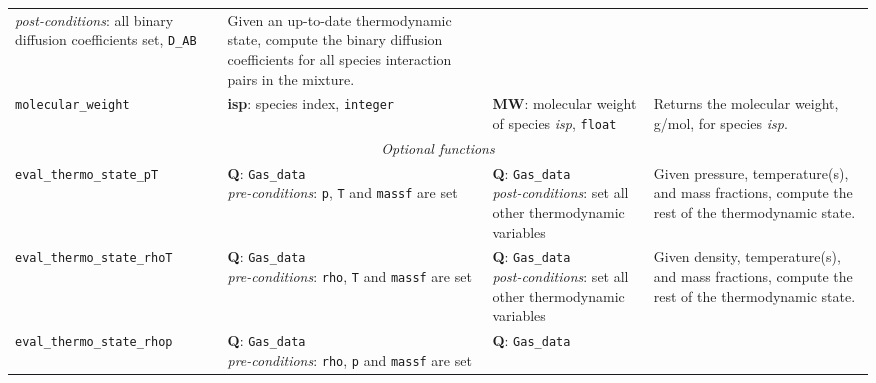 \begin{landscape}
\begin{center}
\begin{longtable}{p{5.5cm}p{4.5cm}p{4.5cm}p{6.5cm}}
{                                                      \textit{post-conditions}: all binary diffusion coefficients set, \texttt{D\_AB}}
                                       & Given an up-to-date thermodynamic state, compute the binary diffusion coefficients for
                                         all species interaction pairs in the mixture. \\
\texttt{molecular\_weight}             & \raggedright{\textbf{isp}: species index, \texttt{integer}} 
                                       & \raggedright{\textbf{MW}: molecular weight of species \textit{isp}, \texttt{float}}
                                       & Returns the molecular weight, g/mol, for species \textit{isp}. \\ \hline
\multicolumn{4}{c}{\emph{Optional functions}} \\
\texttt{eval\_thermo\_state\_pT} & \raggedright{\textbf{Q}: \texttt{Gas\_data} \\
                                                \textit{pre-conditions}: \texttt{p}, \texttt{T} and \texttt{massf} are set}
                                 & \raggedright{\textbf{Q}: \texttt{Gas\_data} \\
                                                  \textit{post-conditions}: set all other thermodynamic variables} 
                                   &   Given pressure, temperature(s), and mass fractions,
                                       compute the rest of the thermodynamic state. \\
\texttt{eval\_thermo\_state\_rhoT} & \raggedright{\textbf{Q}: \texttt{Gas\_data} \\
                                                \textit{pre-conditions}: \texttt{rho}, \texttt{T} and \texttt{massf} are set}
                                 & \raggedright{\textbf{Q}: \texttt{Gas\_data} \\
                                                  \textit{post-conditions}: set all other thermodynamic variables} 
                                   &   Given density, temperature(s), and mass fractions,
                                       compute the rest of the thermodynamic state. \\
\texttt{eval\_thermo\_state\_rhop} & \raggedright{\textbf{Q}: \texttt{Gas\_data} \\
                                                \textit{pre-conditions}: \texttt{rho}, \texttt{p} and \texttt{massf} are set}
                                 & \raggedright{\textbf{Q}: \texttt{Gas\_data} \\
}
\end{longtable}
\end{center}
\end{landscape}
